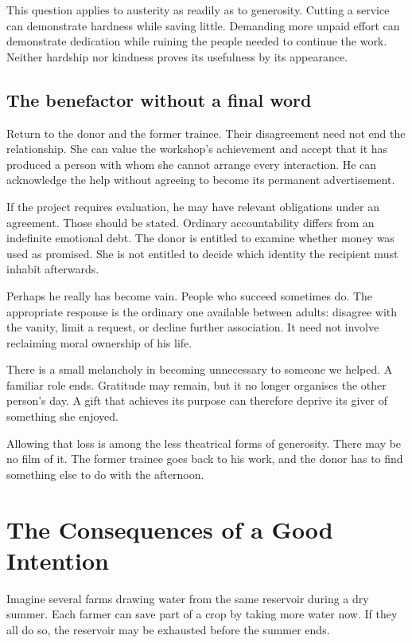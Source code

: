 \documentclass[12pt,a4paper]{book}
\begin{document}
This question applies to austerity as readily as to generosity. Cutting a service can demonstrate hardness while saving little. Demanding more unpaid effort can demonstrate dedication while ruining the people needed to continue the work. Neither hardship nor kindness proves its usefulness by its appearance.

\section*{The benefactor without a final word}

Return to the donor and the former trainee. Their disagreement need not end the relationship. She can value the workshop's achievement and accept that it has produced a person with whom she cannot arrange every interaction. He can acknowledge the help without agreeing to become its permanent advertisement.

If the project requires evaluation, he may have relevant obligations under an agreement. Those should be stated. Ordinary accountability differs from an indefinite emotional debt. The donor is entitled to examine whether money was used as promised. She is not entitled to decide which identity the recipient must inhabit afterwards.

Perhaps he really has become vain. People who succeed sometimes do. The appropriate response is the ordinary one available between adults: disagree with the vanity, limit a request, or decline further association. It need not involve reclaiming moral ownership of his life.

There is a small melancholy in becoming unnecessary to someone we helped. A familiar role ends. Gratitude may remain, but it no longer organises the other person's day. A gift that achieves its purpose can therefore deprive its giver of something she enjoyed.

Allowing that loss is among the less theatrical forms of generosity. There may be no film of it. The former trainee goes back to his work, and the donor has to find something else to do with the afternoon.

\chapter{The Consequences of a Good Intention}

Imagine several farms drawing water from the same reservoir during a dry summer. Each farmer can save part of a crop by taking more water now. If they all do so, the reservoir may be exhausted before the summer ends.
\end{document}
